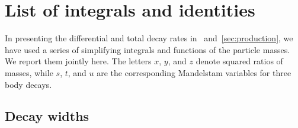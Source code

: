 \section{List of integrals and identities}
\label{app:integrals}

In presenting the differential and total decay rates in~ and~\ref{sec:production}, %
we have used a series of simplifying integrals and functions of the particle masses.
We report them jointly here.
The letters $x$, $y$, and $z$ denote squared ratios of masses, while $s$, $t$, and $u$ are the corresponding Mandelstam variables for three body decays.

\subsection{Decay widths}

